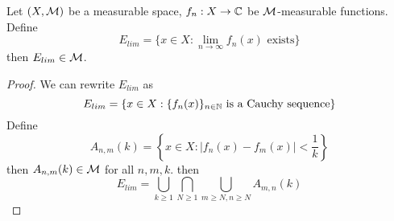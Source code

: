 \begin{theorem}
  Let $(X, \mathcal M)$ be a measurable space, $f_n: X \to \mathbb C$ be $\mathcal M$-measurable functions. 
  Define
  \[E_{lim} = \{x \in X: \lim_{n\to\infty} f_n(x) \text{ exists}\}\]
  then $E_{lim} \in \mathcal M$.
\end{theorem}

\begin{proof}
  We can rewrite $E_{lim}$ as 
  \[E_{lim} = \{x \in X : \{f_n(x)\}_{n \in \mathbb N} \text{ is a Cauchy sequence}\}\]
  Define $$A_{n, m}(k) = \left\{ x \in X : |f_n(x) - f_m(x)| < \frac1k\right\}$$
  then $A_{n, m}(k) \in \mathcal M$ for all $n, m, k$. then 
  \[E_{lim} = \bigcup_{k \ge 1}\bigcap_{N \ge 1} \bigcup_{m \ge N, n \ge N} A_{m,n}(k)\]
\end{proof}